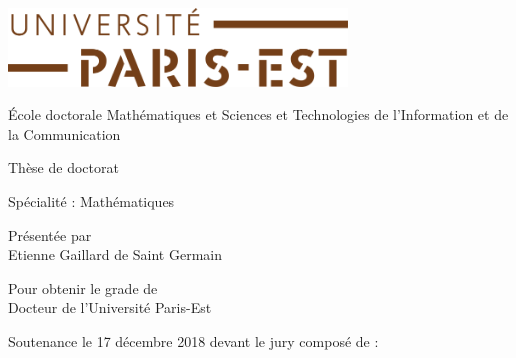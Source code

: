 

\thispagestyle{empty}
\begin{center}
\includegraphics[width=9cm]{head/logo_upe.png}


\vspace*{0.5cm}

{\large \'Ecole doctorale {\sc Math\'ematiques et Sciences et Technologies de l'Information et de la Communication}}

\vspace*{1cm}

{\huge {\sc Th\`ese de doctorat}}

\vspace*{0.5cm}

{\large Sp\'ecialit\'e : Math\'ematiques}

\vspace*{1cm}

{\large Pr\'esent\'ee par}\ \\[1ex]

{\huge {Etienne \sc Gaillard de Saint Germain}}

\vspace*{1cm}

{\large Pour obtenir le grade de \ \\[1ex]
{\sc Docteur de l'Universit\'e Paris-Est}}

\vfill

%
{\Huge {}}

\vspace*{0.5cm}

{\Huge {}}
%
%
%

\vfill

{\Large Soutenance le 17 d\'ecembre 2018 devant le jury compos\'e de :}

\end{center}

